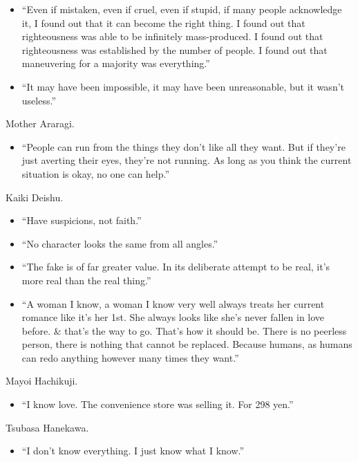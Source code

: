 \documentclass{article}
\begin{document}
\begin{enumerate}
\begin{itemize}
    	Thus, a tale of the wounded begins.

    	A tale of blood.

    	Red when wet, black when dry.

    	A tale of our precious wounds that will never disappear.

    	I will not tell it to anyone.''
    	\item ``Even if mistaken, even if cruel, even if stupid, if many people acknowledge it, I found out that it can become the right thing. I found out that righteousness was able to be infinitely mass-produced. I found out that righteousness was established by the number of people. I found out that maneuvering for a majority was everything.''
    	\item ``It may have been impossible, it may have been unreasonable, but it wasn't useless.''
    \end{itemize}
    {\sf Mother Araragi.}
    \begin{itemize}
    	\item ``People can run from the things they don't like all they want. But if they're just averting their eyes, they're not running. As long as you think the current situation is okay, no one can help.''
    \end{itemize}
    {\sf Kaiki Deishu.}
    \begin{itemize}
    	\item ``Have suspicions, not faith.''
    	\item ``No character looks the same from all angles.''
    	\item ``The fake is of far greater value. In its deliberate attempt to be real, it's more real than the real thing.''
    	\item ``A woman I know, a woman I know very well always treats her current romance like it's her 1st. She always looks like she's never fallen in love before. \& that's the way to go. That's how it should be. There is no peerless person, there is nothing that cannot be replaced. Because humans, as humans can redo anything however many times they want.''
    \end{itemize}
    {\sf Mayoi Hachikuji.}
    \begin{itemize}
    	\item ``I know love. The convenience store was selling it. For 298 yen.''
    \end{itemize}
    {\sf Tsubasa Hanekawa.}
    \begin{itemize}
    	\item ``I don't know everything. I just know what I know.''

\end{itemize}
\end{enumerate}
\end{document}

